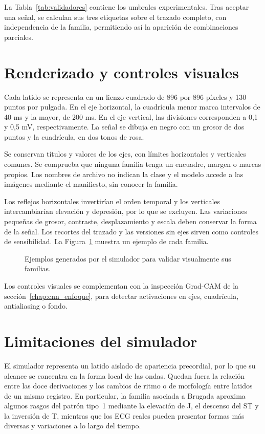 La Tabla~\ref{tab:validadores} contiene los umbrales experimentales. Tras aceptar una señal, se calculan sus tres etiquetas sobre el trazado completo, con independencia de la familia, permitiendo así la aparición de combinaciones parciales.

\section{Renderizado y controles visuales}

Cada latido se representa en un lienzo cuadrado de 896 por 896 píxeles y 130 puntos por pulgada. En el eje horizontal, la cuadrícula menor marca intervalos de 40 ms y la mayor, de 200 ms. En el eje vertical, las divisiones corresponden a 0,1 y 0,5 mV, respectivamente. La señal se dibuja en negro con un grosor de dos puntos y la cuadrícula, en dos tonos de rosa.

Se conservan títulos y valores de los ejes, con límites horizontales y verticales comunes. Se comprueba que ninguna familia tenga un encuadre, margen o marcas propios. Los nombres de archivo no indican la clase y el modelo accede a las imágenes mediante el manifiesto, sin conocer la familia.

Los reflejos horizontales invertirían el orden temporal y los verticales intercambiarían elevación y depresión, por lo que se excluyen. Las variaciones pequeñas de grosor, contraste, desplazamiento y escala deben conservar la forma de la señal. Los recortes del trazado y las versiones sin ejes sirven como controles de sensibilidad. La Figura~\ref{fig:synthetic_examples} muestra un ejemplo de cada familia.

\begin{figure}[H]
  \centering
  \caption{Ejemplos generados por el simulador para validar visualmente sus familias.}
  \label{fig:synthetic_examples}
\end{figure}

Los controles visuales se complementan con la inspección Grad-CAM de la sección~\ref{chap:cnn_enfoque}, para detectar activaciones en ejes, cuadrícula, antialiasing o fondo.

\section{Limitaciones del simulador}

El simulador representa un latido aislado de apariencia precordial, por lo que su alcance se concentra en la forma local de las ondas. Quedan fuera la relación entre las doce derivaciones y los cambios de ritmo o de morfología entre latidos de un mismo registro. En particular, la familia asociada a Brugada aproxima algunos rasgos del patrón tipo~1 mediante la elevación de J, el descenso del ST y la inversión de T, mientras que los ECG reales pueden presentar formas más diversas y variaciones a lo largo del tiempo.

